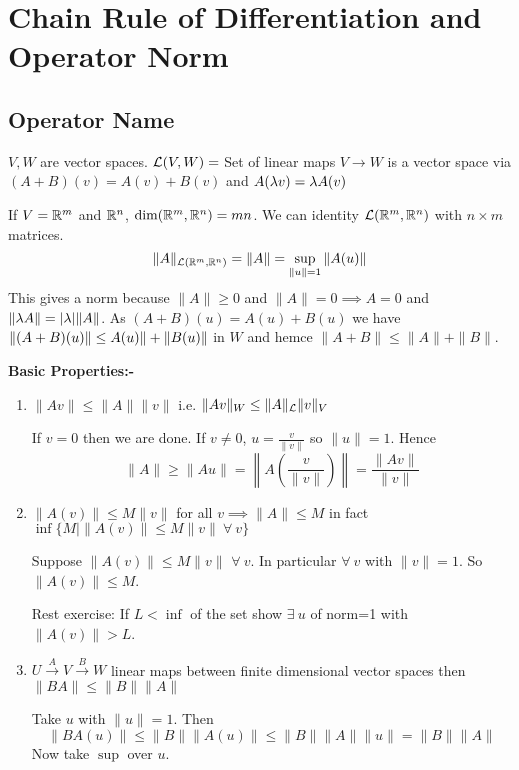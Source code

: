 \chapter{Chain Rule of Differentiation and Operator Norm}
\section{Operator Name}
$V,W$ are vector spaces. $\mathcal{L}(V,W)=$ Set of linear maps $V\to W$ is a vector space via $(A+B)(v)=A(v)+B(v)$ and $A(\lambda v)=\lambda A(v)$

If $V=\mathbb{R}^m$ and $\mathbb{R}^n$, $\dim (\mathbb{R}^m,\mathbb{R}^n)=mn$. We can identity $\mathcal{L}(\mathbb{R}^m,\mathbb{R}^n)$ with $n\times m$ matrices. $$\|A\|_{\mathcal{L}(\mathbb{R}^m,\mathbb{R}^n)}=\|A\|=\sup\limits_{\|u\|=1} \|A(u)\|$$This gives a norm because $\|A\|\geq 0$ and $\|A\|=0\implies A=0$ and  $\|\lambda A\|=|\lambda|\|A\|$. As  $(A+B)(u)=A(u)+B(u)$ we have $\|(A+B)(u)\|\leq \\A(u)\|+\|B(u)\|$ in $W$ and hemce $\|A+B\|\leq \|A\|+\|B\|$.

\textbf{Basic Properties:-}
\begin{enumerate}
	\item $\|Av\|\leq \|A\| \|v\|$ i.e. $\|Av\|_W\leq \|A\|_{\mathcal{L}}\|v\|_V$
	      \begin{myproof}
		      If $v=0$ then we are done. If $v\neq 0$, $u=\frac{v}{\|v\|}$ so $\|u\|=1$. Hence $$\|A\|\geq \|Au\|=\left\|A\left(\frac{v}{\|v\|}\right)\right\|=\frac{\|Av\|}{\|v\|}$$
	      \end{myproof}
	\item $\|A(v)\|\leq M\|v\|$ for all $v\implies \|A\|\leq M$ in fact $\inf\{M\mid \|A(v)\|\leq M\|v\|\ \forall\ v\}$
	      \begin{myproof}
		      Suppose $\|A(v)\|\leq M\|v\|$ $\forall\ v$. In particular $\forall\ v$ with $\|v\|=1$. So $\|A(v)\|\leq M$.

		      Rest exercise: If $L<\inf$ of the set  show $\exists \ u$ of norm=1 with $\|A(v)\| >L$.
	      \end{myproof}
	\item $U\xrightarrow{A}V\xrightarrow{B}W$ linear maps between finite dimensional vector spaces  then $\|BA\|\leq \|B\|\|A\|$
	      \begin{myproof}
		      Take $u$ with $\|u\|=1$. Then $$\|BA(u)\|\leq \|B\|\|A(u)\|\leq \|B\|\|A\|\|u\|=\|B\|\|A\|$$Now take $\sup$ over $u$.
	      \end{myproof}
\end{enumerate}

